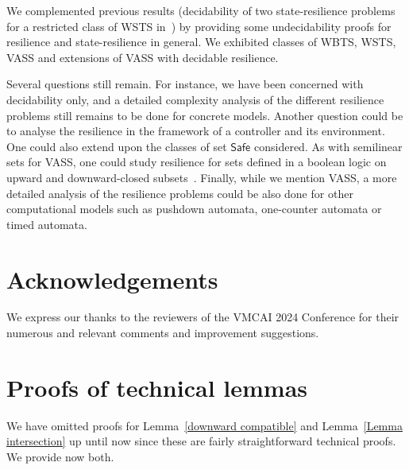 \documentclass[runningheads]{llncs}
\newcommand{\mathieu}[1]{\todo[inline,color=blue!20]{{\bf MH:} #1}}
\newcommand{\Safe}{\textsf{Safe}}
\begin{document}
We complemented previous results (decidability of two state-resilience problems for a restricted class of WSTS in~\cite{DBLP:journals/corr/PrasadZ16,DBLP:journals/corr/abs-2108-00889,DBLP:conf/gg/Ozkan22}) by providing some undecidability proofs for resilience and state-resilience in general. We exhibited classes of WBTS, WSTS, VASS and extensions of VASS with decidable resilience.

Several questions still remain.
For instance, we have been concerned with decidability only, and a detailed complexity analysis of the different resilience problems still remains to be done for concrete models.
%
%
Another question could be to analyse the resilience in the framework of a controller and its environment. 
One could also extend upon the classes of set $\Safe$ 
 considered. As with semilinear sets for VASS, one could study resilience for sets defined in a boolean logic on upward and downward-closed subsets~\cite{DBLP:journals/fmsd/BertrandS13}. Finally, while we mention VASS, a more detailed analysis of the resilience problems could be also done for other computational models such as pushdown automata, one-counter automata or timed automata.


\section*{Acknowledgements} We express our thanks to the reviewers of the VMCAI 2024 Conference for their numerous and relevant comments and improvement suggestions.




\appendix


\section{Proofs of technical lemmas}


We have omitted proofs for Lemma~\ref{downward compatible} and Lemma~\ref{Lemma intersection}
up until now since these are fairly straightforward technical proofs.
We provide now both. \\
\end{document}
